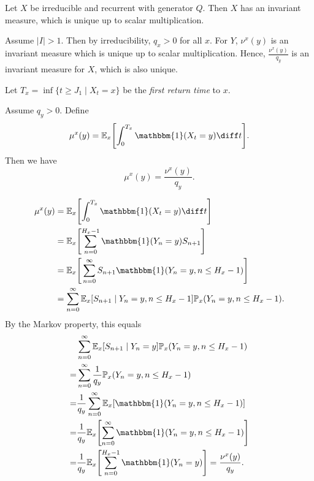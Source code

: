 \documentclass[12pt]{article}
\begin{document}
\begin{theorem}
	Let $X$ be irreducible and recurrent with generator $Q$. Then $X$ has an invariant measure, which is unique up to scalar multiplication.
\end{theorem}

\begin{proofbox}
	Assume $|I| > 1$. Then by irreducibility, $q_x > 0$ for all $x$. For $Y$, $\nu^{x}(y)$ is an invariant measure which is unique up to scalar multiplication. Hence, $\frac{\nu^{x}(y)}{q_y}$ is an invariant measure for $X$, which is also unique.
\end{proofbox}

\begin{definition}
	Let $T_x = \inf\{t \geq J_1 \mid X_t = x\}$ be the \emph{first return time} to $x$.
\end{definition}

\begin{lemma}
	Assume $q_y > 0$. Define
	\[
		\mu^{x}(y) = \mathbb{E}_x \Biggl[ \int_{0}^{T_x} \mathbbm{1}(X_t = y) \diff t \Biggr]
	.\]
	Then we have
	\[
	\mu^{x}(y) = \frac{\nu^{x}(y)}{q_y}
	.\]
\end{lemma}

\begin{proofbox}
	\begin{align*}
		\mu^{x}(y) &= \mathbb{E}_x\Biggl[ \int_{0}^{T_x} \mathbbm{1}(X_t = y) \diff t \Biggr] \\
			   &= \mathbb{E}_x \Biggl[ \sum_{n = 0}^{H_x - 1} \mathbbm{1}(Y_n = y) S_{n+1} \Biggr] \\
			   &= \mathbb{E}_x \Biggr[ \sum_{n = 0}^{\infty} S_{n+1} \mathbbm{1}(Y_n = y, n \leq H_x - 1) \Biggl] \\
			   &= \sum_{n = 0}^{\infty} \mathbb{E}_x[S_{n+1} \mid Y_n = y, n \leq H_{x} - 1] \mathbb{P}_x(Y_n = y, n \leq H_x - 1).
	\end{align*}
	By the Markov property, this equals
	\begin{align*}
		& \sum_{n = 0}^{\infty} \mathbb{E}_x [S_{n+1} \mid Y_n = y] \mathbb{P}_x(Y_n = y, n \leq H_x - 1) \\
		=& \sum_{n = 0}^{\infty} \frac{1}{q_y} \mathbb{P}_x(Y_n = y, n \leq H_x - 1) \\
		=& \frac{1}{q_y} \sum_{n = 0}^{\infty} \mathbb{E}_x[\mathbbm{1}(Y_n = y, n \leq H_x - 1)] \\
		=& \frac{1}{q_y} \mathbb{E}_x \Biggl[ \sum_{n = 0}^{\infty} \mathbbm{1}(Y_n = y, n \leq H_x - 1) \Biggr] \\
		=& \frac{1}{q_y} \mathbb{E}_x \Biggl[ \sum_{n = 0}^{H_x - 1} \mathbbm{1}(Y_n = y) \Biggr] = \frac{\nu^{x}(y)}{q_y}.
	\end{align*}	
\end{proofbox}
\end{document}
